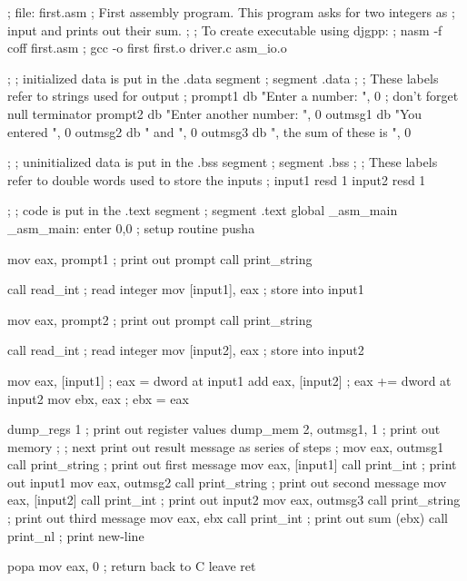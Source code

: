 \begin{AsmCodeListing}[label=first.asm]
; file: first.asm
; First assembly program. This program asks for two integers as
; input and prints out their sum.
;
; To create executable using djgpp:
; nasm -f coff first.asm
; gcc -o first first.o driver.c asm_io.o

;
; initialized data is put in the .data segment
;
segment .data
;
; These labels refer to strings used for output
;
prompt1 db    "Enter a number: ", 0       ; don't forget null terminator
prompt2 db    "Enter another number: ", 0
outmsg1 db    "You entered ", 0
outmsg2 db    " and ", 0
outmsg3 db    ", the sum of these is ", 0

;
; uninitialized data is put in the .bss segment
;
segment .bss
;
; These labels refer to double words used to store the inputs
;
input1  resd 1
input2  resd 1

;
; code is put in the .text segment
;
segment .text
        global  _asm_main
_asm_main:
        enter   0,0               ; setup routine
        pusha

        mov     eax, prompt1      ; print out prompt
        call    print_string

        call    read_int          ; read integer
        mov     [input1], eax     ; store into input1

        mov     eax, prompt2      ; print out prompt
        call    print_string

        call    read_int          ; read integer
        mov     [input2], eax     ; store into input2

        mov     eax, [input1]     ; eax = dword at input1
        add     eax, [input2]     ; eax += dword at input2
        mov     ebx, eax          ; ebx = eax

        dump_regs 1                ; print out register values
        dump_mem  2, outmsg1, 1    ; print out memory
;
; next print out result message as series of steps
;
        mov     eax, outmsg1
        call    print_string      ; print out first message
        mov     eax, [input1]     
        call    print_int         ; print out input1
        mov     eax, outmsg2
        call    print_string      ; print out second message
        mov     eax, [input2]
        call    print_int         ; print out input2
        mov     eax, outmsg3
        call    print_string      ; print out third message
        mov     eax, ebx
        call    print_int         ; print out sum (ebx)
        call    print_nl          ; print new-line

        popa
        mov     eax, 0            ; return back to C
        leave                     
        ret
\end{AsmCodeListing}

